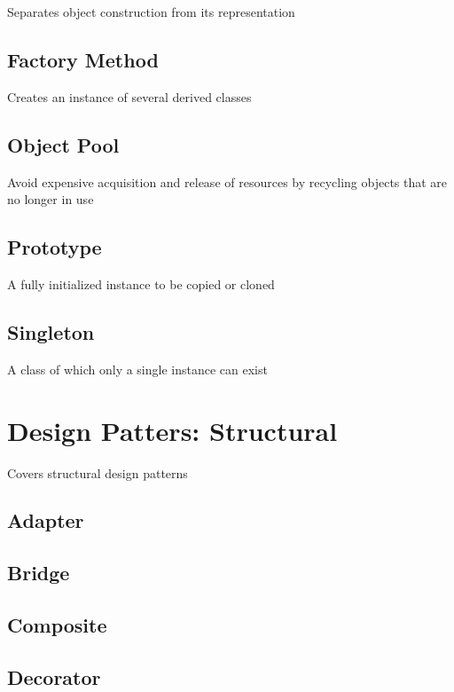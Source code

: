 \documentclass[]{article}
\begin{document}
Separates object construction from its representation

\subsection{Factory Method}\label{factory-method}

Creates an instance of several derived classes

\subsection{Object Pool}\label{object-pool}

Avoid expensive acquisition and release of resources by recycling
objects that are no longer in use

\subsection{Prototype}\label{prototype}

A fully initialized instance to be copied or cloned

\subsection{Singleton}\label{singleton}

A class of which only a single instance can exist

\section{Design Patters: Structural}\label{design-patters-structural}

Covers structural design patterns

\subsection{Adapter}\label{adapter}

\subsection{Bridge}\label{bridge}

\subsection{Composite}\label{composite}

\subsection{Decorator}\label{decorator}
\end{document}

